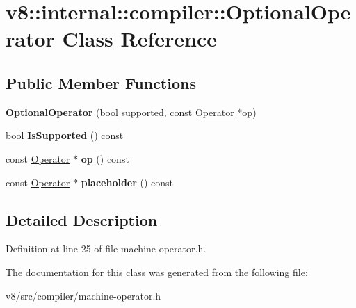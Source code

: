 \hypertarget{classv8_1_1internal_1_1compiler_1_1OptionalOperator}{}\section{v8\+:\+:internal\+:\+:compiler\+:\+:Optional\+Operator Class Reference}
\label{classv8_1_1internal_1_1compiler_1_1OptionalOperator}
\subsection*{Public Member Functions}
\begin{DoxyCompactItemize}
\item 
\mbox{\label{classv8_1_1internal_1_1compiler_1_1OptionalOperator_a3f1ed72363585366ff878ce3cde2c97f}} 
{\bfseries Optional\+Operator} (\mbox{\hyperlink{classbool}{bool}} supported, const \mbox{\hyperlink{classv8_1_1internal_1_1compiler_1_1Operator}{Operator}} $\ast$op)
\item 
\mbox{\label{classv8_1_1internal_1_1compiler_1_1OptionalOperator_a01fcb703d702876eab8f797d0d40d302}} 
\mbox{\hyperlink{classbool}{bool}} {\bfseries Is\+Supported} () const
\item 
\mbox{\label{classv8_1_1internal_1_1compiler_1_1OptionalOperator_a3ffe84381d563ed5477e18fd7d068034}} 
const \mbox{\hyperlink{classv8_1_1internal_1_1compiler_1_1Operator}{Operator}} $\ast$ {\bfseries op} () const
\item 
\mbox{\label{classv8_1_1internal_1_1compiler_1_1OptionalOperator_aa768d8457855d952f848fbcec0724edd}} 
const \mbox{\hyperlink{classv8_1_1internal_1_1compiler_1_1Operator}{Operator}} $\ast$ {\bfseries placeholder} () const
\end{DoxyCompactItemize}


\subsection{Detailed Description}


Definition at line 25 of file machine-\/operator.\+h.



The documentation for this class was generated from the following file\+:\begin{DoxyCompactItemize}
\item 
v8/src/compiler/machine-\/operator.\+h\end{DoxyCompactItemize}
